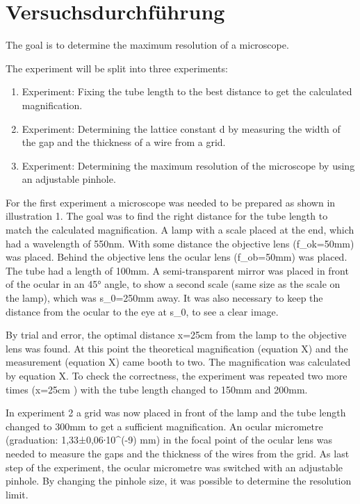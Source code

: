 \section{Versuchsdurchführung}

The goal is to determine the maximum resolution of a microscope.

The experiment will be split into three experiments:

\begin{enumerate}
	\item{Experiment: Fixing the tube length to the best distance to get the calculated magnification.}
	\item{Experiment: Determining the lattice constant d by measuring the width of the gap and the thickness of a wire from a grid.}
	\item{Experiment: Determining the maximum resolution of the microscope by using an adjustable pinhole.}
\end{enumerate}

For the first experiment a microscope was needed to be prepared as shown in illustration 1.  The goal was to find the right distance for the tube length to match the calculated magnification. A lamp with a scale placed at the end, which had a wavelength of 550nm. With some distance the objective lens (f\_ok=50mm) was placed. Behind the objective lens the ocular lens (f\_ob=50mm) was placed. The tube had a length of 100mm. A semi-transparent mirror was placed in front of the ocular in an 45° angle, to show a second scale (same size as the scale on the lamp), which was s\_0=250mm away. It was also necessary to keep the distance from the ocular to the eye at s\_0, to see a clear image.

By trial and error, the optimal distance x=25cm from the lamp to the objective lens was found. At this point the theoretical magnification (equation X) and the measurement (equation X) came booth to two. The magnification was calculated by equation X. To check the correctness, the experiment was repeated two more times (x=25cm ) with the tube length changed to 150mm and 200mm.

In experiment 2 a grid was now placed in front of the lamp and the tube length changed to 300mm to get a sufficient magnification. An ocular micrometre (graduation: 1,33±0,06∙10^(-9) mm) in the focal point of the ocular lens was needed to measure the gaps and the thickness of the wires from the grid.
As last step of the experiment, the ocular micrometre was switched with an adjustable pinhole. By changing the pinhole size, it was possible to determine the resolution limit.

\newpage
